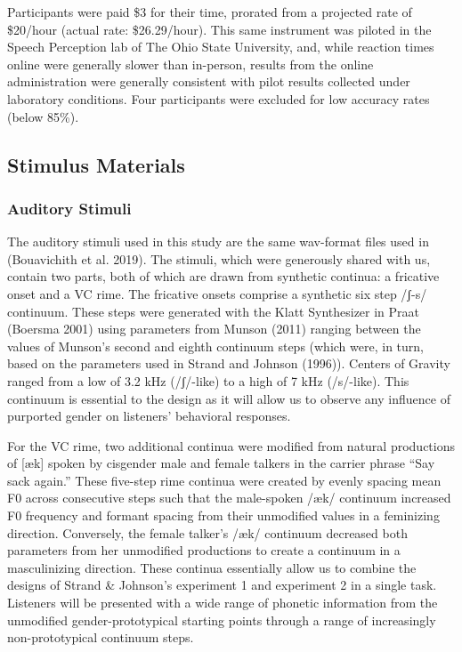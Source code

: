 \documentclass[
  letterpaper,
  DIV=11,
  numbers=noendperiod]{scrartcl}
\begin{document}
Participants were paid \$3 for their time, prorated from a projected
rate of \$20/hour (actual rate: \$26.29/hour). This same instrument was
piloted in the Speech Perception lab of The Ohio State University, and,
while reaction times online were generally slower than in-person,
results from the online administration were generally consistent with
pilot results collected under laboratory conditions. Four participants
were excluded for low accuracy rates (below 85\%).

\subsection{Stimulus Materials}\label{sec-stimuli}

\subsubsection{Auditory Stimuli}\label{sec-stimuli-auditory}

The auditory stimuli used in this study are the same wav-format files
used in (Bouavichith et al. 2019). The stimuli, which were generously
shared with us, contain two parts, both of which are drawn from
synthetic continua: a fricative onset and a VC rime. The fricative
onsets comprise a synthetic six step /ʃ-s/ continuum. These steps were
generated with the Klatt Synthesizer in Praat (Boersma 2001) using
parameters from Munson (2011) ranging between the values of Munson's
second and eighth continuum steps (which were, in turn, based on the
parameters used in Strand and Johnson (1996)). Centers of Gravity ranged
from a low of 3.2 kHz (/ʃ/-like) to a high of 7 kHz (/s/-like). This
continuum is essential to the design as it will allow us to observe any
influence of purported gender on listeners' behavioral responses.

For the VC rime, two additional continua were modified from natural
productions of {[}æk{]} spoken by cisgender male and female talkers in
the carrier phrase ``Say sack again.'' These five-step rime continua
were created by evenly spacing mean F0 across consecutive steps such
that the male-spoken /æk/ continuum increased F0 frequency and formant
spacing from their unmodified values in a feminizing direction.
Conversely, the female talker's /æk/ continuum decreased both parameters
from her unmodified productions to create a continuum in a masculinizing
direction. These continua essentially allow us to combine the designs of
Strand \& Johnson's experiment 1 and experiment 2 in a single task.
Listeners will be presented with a wide range of phonetic information
from the unmodified gender-prototypical starting points through a range
of increasingly non-prototypical continuum steps.
\end{document}
